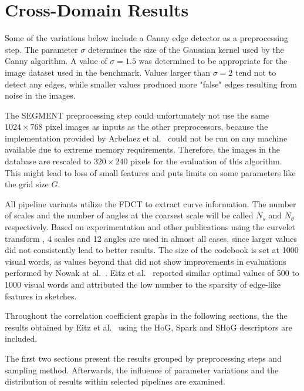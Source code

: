 \section{Cross-Domain Results}\label{sec:cross_results}

Some of the variations below include a Canny edge detector as a preprocessing
step. The parameter $\sigma$ determines the size of the Gaussian kernel used by
the Canny algorithm. A value of $\sigma = 1.5$ was determined to be appropriate
for the image dataset used in the benchmark. Values larger than $\sigma = 2$
tend not to detect any edges, while smaller values produced more "false" edges
resulting from noise in the images.

The SEGMENT preprocessing step could unfortunately not use the same $1024
\times 768$ pixel images as inputs as the other preprocessors, because the
implementation provided by Arbelaez et al.\ \autocite{arbelaez_contour_2011}
could not be run on any machine available due to extreme memory requirements.
Therefore, the images in the database are rescaled to $320 \times 240$ pixels
for the evaluation of this algorithm. This might lead to loss of small features
    and puts limits on some parameters like the grid size $G$.

All pipeline variants utilize the FDCT to extract curve information. The number
of scales and the number of angles at the coarsest scale will be called $N_s$
and $N_{\theta}$ respectively. Based on experimentation and other publications
using the curvelet transform \autocite{mandal_curvelet_2009}
\autocite{guha_curvelet_2010}, 4 scales and 12 angles are used in almost all
cases, since larger values did not consistently lead to better results. The
size of the codebook is set at 1000 visual words, as values beyond that did
not show improvements in evaluations performed by Nowak at al.\
\autocite{nowak_sampling_2006}. Eitz et al.\ \autocite{eitz_sketch-based_2011}
reported similar optimal values of 500 to 1000 visual words and attributed the
low number to the sparsity of edge-like features in sketches.

Throughout the correlation coefficient graphs in the following sections, the
the results obtained by Eitz et al.\ \autocite{eitz_sketch-based_2011} using
the HoG, Spark and SHoG descriptors are included.

The first two sections present the results grouped by preprocessing steps and
sampling method. Afterwards, the influence of parameter variations and the
distribution of results within selected pipelines are examined.






